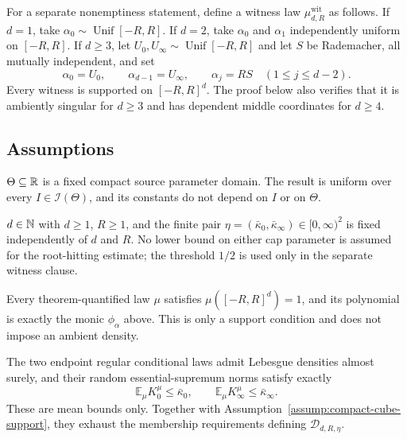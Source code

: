 For a separate nonemptiness statement, define a witness law
$\mu^{\mathrm{wit}}_{d,R}$ as follows.  If $d=1$, take
$\alpha_0\sim\operatorname{Unif}[-R,R]$.  If $d=2$, take
$\alpha_0$ and $\alpha_1$ independently uniform on $[-R,R]$.  If $d\geq3$,
let $U_0,U_\infty\sim\operatorname{Unif}[-R,R]$ and let $S$ be Rademacher,
all mutually independent, and set
\[
\alpha_0=U_0,\qquad \alpha_{d-1}=U_\infty,
\qquad \alpha_j=RS\quad(1\leq j\leq d-2).
\]
Every witness is supported on $[-R,R]^d$.  The proof below also verifies
that it is ambiently singular for $d\geq3$ and has dependent middle
coordinates for $d\geq4$.

\subsection{Assumptions}

\begin{assumption}
\label{assump:compact-parameter-domain}
$\Theta\subseteq\mathbb{R}$ is a fixed compact source parameter domain.  The result
is uniform over every $I\in\mathcal I(\Theta)$, and its constants do not
depend on $I$ or on $\Theta$.
\end{assumption}

\begin{assumption}
\label{assump:indexed-regime}
$d\in\mathbb{N}$ with $d\geq1$, $R\geq1$, and the finite pair
$\eta=(\bar\kappa_0,\bar\kappa_\infty)\in[0,\infty)^2$ is fixed
independently of $d$ and $R$.  No lower bound on either cap parameter is
assumed for the root-hitting estimate; the threshold $1/2$ is used only in
the separate witness clause.
\end{assumption}

\begin{assumption}
\label{assump:compact-cube-support}
Every theorem-quantified law $\mu$ satisfies $\mu([-R,R]^d)=1$, and its
polynomial is exactly the monic $\phi_\alpha$ above.  This is only a support
condition and does not impose an ambient density.
\end{assumption}

\begin{assumption}
\label{assump:mean-endpoint-conditional-caps}
The two endpoint regular conditional laws admit Lebesgue densities almost
surely, and their random essential-supremum norms satisfy exactly
\[
\mathbb E_\mu K_0^\mu\leq\bar\kappa_0,
\qquad
\mathbb E_\mu K_\infty^\mu\leq\bar\kappa_\infty.
\]
These are mean bounds only.  Together with
Assumption~\ref{assump:compact-cube-support}, they exhaust the membership
requirements defining $\mathcal D_{d,R,\eta}$.
\end{assumption}

